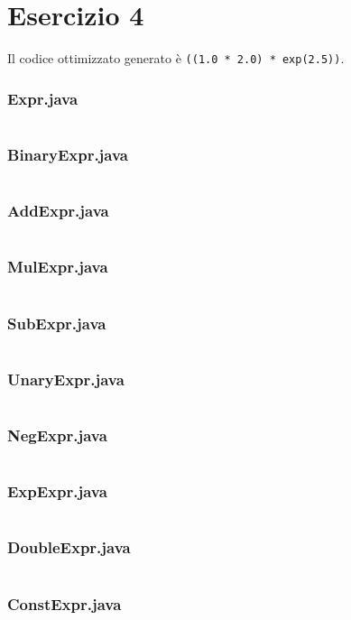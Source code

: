 \section*{Esercizio 4}

Il codice ottimizzato generato è \texttt{((1.0 * 2.0) * exp(2.5))}.

\subsubsection*{Expr.java}
\inputminted{java}{tex/src/4/Expr.java}

\subsubsection*{BinaryExpr.java}
\inputminted{java}{tex/src/4/BinaryExpr.java}

\subsubsection*{AddExpr.java}
\inputminted{java}{tex/src/4/AddExpr.java}

\subsubsection*{MulExpr.java}
\inputminted{java}{tex/src/4/MulExpr.java}

\subsubsection*{SubExpr.java}
\inputminted{java}{tex/src/4/SubExpr.java}

\subsubsection*{UnaryExpr.java}
\inputminted{java}{tex/src/4/UnaryExpr.java}

\subsubsection*{NegExpr.java}
\inputminted{java}{tex/src/4/NegExpr.java}

\subsubsection*{ExpExpr.java}
\inputminted{java}{tex/src/4/ExpExpr.java}

\subsubsection*{DoubleExpr.java}
\inputminted{java}{tex/src/4/DoubleExpr.java}

\subsubsection*{ConstExpr.java}
\inputminted{java}{tex/src/4/ConstExpr.java}

